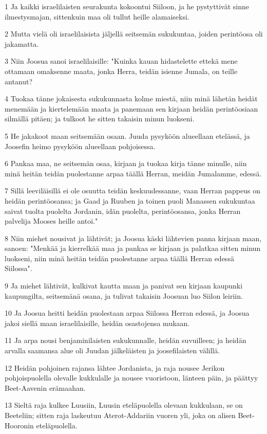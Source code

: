 \par 1 Ja kaikki israelilaisten seurakunta kokoontui Siiloon, ja he pystyttivät sinne ilmestysmajan, sittenkuin maa oli tullut heille alamaiseksi.
\par 2 Mutta vielä oli israelilaisista jäljellä seitsemän sukukuntaa, joiden perintöosa oli jakamatta.
\par 3 Niin Joosua sanoi israelilaisille: "Kuinka kauan hidastelette ettekä mene ottamaan omaksenne maata, jonka Herra, teidän isienne Jumala, on teille antanut?
\par 4 Tuokaa tänne jokaisesta sukukunnasta kolme miestä, niin minä lähetän heidät menemään ja kiertelemään maata ja panemaan sen kirjaan heidän perintöosiaan silmällä pitäen; ja tulkoot he sitten takaisin minun luokseni.
\par 5 He jakakoot maan seitsemään osaan. Juuda pysyköön alueellaan etelässä, ja Joosefin heimo pysyköön alueellaan pohjoisessa.
\par 6 Pankaa maa, ne seitsemän osaa, kirjaan ja tuokaa kirja tänne minulle, niin minä heitän teidän puolestanne arpaa täällä Herran, meidän Jumalamme, edessä.
\par 7 Sillä leeviläisillä ei ole osuutta teidän keskuudessanne, vaan Herran pappeus on heidän perintöosansa; ja Gaad ja Ruuben ja toinen puoli Manassen sukukuntaa saivat tuolta puolelta Jordanin, idän puolelta, perintöosansa, jonka Herran palvelija Mooses heille antoi."
\par 8 Niin miehet nousivat ja lähtivät; ja Joosua käski lähtevien panna kirjaan maan, sanoen: "Menkää ja kierrelkää maa ja pankaa se kirjaan ja palatkaa sitten minun luokseni, niin minä heitän teidän puolestanne arpaa täällä Herran edessä Siilossa".
\par 9 Ja miehet lähtivät, kulkivat kautta maan ja panivat sen kirjaan kaupunki kaupungilta, seitsemänä osana, ja tulivat takaisin Joosuan luo Siilon leiriin.
\par 10 Ja Joosua heitti heidän puolestaan arpaa Siilossa Herran edessä, ja Joosua jakoi siellä maan israelilaisille, heidän osastojensa mukaan.
\par 11 Ja arpa nousi benjaminilaisten sukukunnalle, heidän suvuilleen; ja heidän arvalla saamansa alue oli Juudan jälkeläisten ja joosefilaisten välillä.
\par 12 Heidän pohjoinen rajansa lähtee Jordanista, ja raja nousee Jerikon pohjoispuolella olevalle kukkulalle ja nousee vuoristoon, länteen päin, ja päättyy Beet-Aavenin erämaahan.
\par 13 Sieltä raja kulkee Luusiin, Luusin eteläpuolella olevaan kukkulaan, se on Beeteliin; sitten raja laskeutuu Aterot-Addariin vuoren yli, joka on alisen Beet-Hooronin eteläpuolella.
